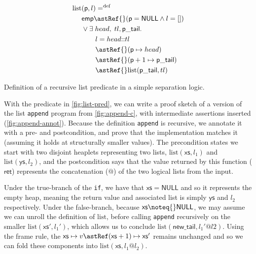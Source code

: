 \begin{marginfigure}
    \centering
    \begin{align*}
        \mathrm{list} &(\mathsf{p}, l) \mathrel{{=}^\mathrm{def}} \\
                      &\mathsf{emp} \astRef{} (\mathsf{p} = \mathsf{NULL} \wedge{} l = []) \\
                      &\vee{} \exists{} \; {head}, \; {tl}, \mathsf{p\_tail}.\\
                      &\qquad l = {head} {:}{:} {tl} \\
                      &\qquad \astRef{} (\mathsf{p} \mapsto{} {head}) \\
                      &\qquad \astRef{} (\mathsf{p} + 1 \mapsto{} \mathsf{p\_tail}) \\
                      &\qquad \astRef{} \mathrm{list} (\mathsf{p\_tail}, {tl})
    \end{align*}
    \caption{Definition of a recursive list predicate in a simple separation
        logic.}\label{fig:list-pred}
\end{marginfigure}

With the predicate in \cref{fig:list-pred}, we can write a proof sketch of a
version of the list \texttt{append} program from \cref{fig:append-c},
with intermediate assertions inserted (\cref{fig:append-annot}). Because the
definition \texttt{append} is recursive, we annotate it with a pre-
and postcondition, and prove that the implementation matches it (assuming it
holds at structurally smaller values). The precondition states we start with
two disjoint heaplets representing two  lists,
$\mathrm{list}(\mathsf{xs}, l_1)$ and $\mathrm{list}(\mathsf{ys}, l_2)$, and
the postcondition says that the value returned by this function
($\mathsf{ret}$) represents the concatenation ($@$) of the two logical lists
from the input.

Under the true-branch of the \texttt{if}, we have that $\mathsf{xs} =
\mathsf{NULL}$ and so it represents the empty heap, meaning the return value
and associated  list is simply $\mathsf{ys}$ and $l_2$ respectively.
Under the false-branch, because $\mathsf{xs} \noteq{} \mathsf{NULL}$, we may
assume we can unroll the definition of $\mathrm{list}$, before calling
\texttt{append} recursively on the smaller
$\mathrm{list}(\mathsf{xs}', l_1')$, which allows us to conclude
$\mathrm{list}(\mathsf{new\_tail}, l_1' @ l2)$. Using the frame rule, the
$\mathsf{xs} \mapsto v \astRef (\mathsf{xs} + 1) \mapsto \mathsf{xs}'$ remains
unchanged and so we can fold these components into $\mathrm{list}(\mathsf{xs},
l_1 @ l_2)$.

